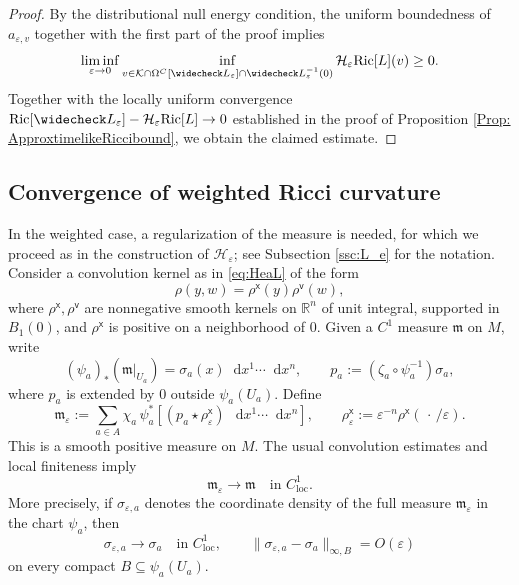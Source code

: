 \documentclass[a4paper,11pt]{article}
\numberwithin{equation}{section}
\theoremstyle{definition}
\theoremstyle{plain}
\newcommand{\R}{\mathbb R}
\newcommand{\eps}{\varepsilon}
\newcommand{\Ric}{\mathrm{Ric}}
\newcommand*\diff{\mathop{}\!\mathrm{d}}
\begin{document}
\begin{proof}
By the distributional null energy condition, the uniform boundedness of $a_{\varepsilon,v}$ together with the first part of the proof implies
\[
    \liminf_{\varepsilon\to0}
    \inf_{v\in \mathcal K\cap\Omega^C[\widecheck L_\eps] \cap \widecheck L_\eps^{-1}(0)}
    \mathcal H_\varepsilon\Ric[L](v)\geq0.
\]
Together with the locally uniform convergence $\Ric[\widecheck L_\varepsilon] -\mathcal H_\varepsilon\Ric[L]\rightarrow0$ established in the proof of Proposition \ref{Prop: ApproxtimelikeRiccibound}, we obtain the claimed estimate.
\end{proof}

\subsection{Convergence of weighted Ricci curvature}

In the weighted case, a regularization of the measure is needed, for which we proceed as in the construction of $\mathcal H_\varepsilon$; see Subsection \ref{ssc:L_e} for the notation.
Consider a convolution kernel as in \eqref{eq:HeaL} of the form
\[
    \rho(y,w)=\rho^\mathsf x(y)\rho^\mathsf v (w),
\]
where $\rho^\mathsf x,\rho^\mathsf v$ are nonnegative smooth kernels on $\R^n$ of unit integral, supported in $B_1(0)$, and $\rho^\mathsf x$ is positive on a neighborhood of $0$.
Given a $C^1$ measure $\mathfrak m$ on $M$, write
\[
    (\psi_a)_*(\mathfrak m|_{U_a})
    =\sigma_a(x) \diff x^1 \cdots \diff x^n,
    \qquad
    p_a:=(\zeta_a\circ\psi_a^{-1})\sigma_a,
\]
where $p_a$ is extended by $0$ outside $\psi_a(U_a)$.
Define
\begin{equation*}
    \mathfrak m_\varepsilon
    :=
    \sum_{a\in A}
    \chi_a\,\psi_a^*
    \left[
        (p_a \star\rho^\mathsf x_\varepsilon)\,\diff x^1 \cdots \diff x^n
    \right],
    \qquad
    \rho^{\mathsf{x}}_\varepsilon
    :=\varepsilon^{-n}\rho^\mathsf x(\,\cdot\,/\varepsilon).
\end{equation*}
This is a smooth positive measure on $M$. The usual convolution estimates and local finiteness imply
\[
    \mathfrak m_\varepsilon\rightarrow\mathfrak m
    \quad\text{in }C^1_{\mathrm{loc}}.
\]
More precisely, if $\sigma_{\varepsilon,a}$ denotes the coordinate density of the full measure $\mathfrak m_\varepsilon$ in the chart $\psi_a$, then
\[
    \sigma_{\varepsilon,a}\rightarrow\sigma_a
    \quad\text{in }C^1_{\mathrm{loc}},
    \qquad
    \|\sigma_{\varepsilon,a}-\sigma_a\|_{\infty,B}
    =O(\varepsilon)
\]
on every compact $B\subseteq\psi_a(U_a)$.
\end{document}
